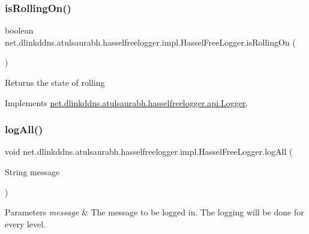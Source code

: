\subsubsection{\texorpdfstring{is\+Rolling\+On()}{isRollingOn()}}
{\footnotesize\ttfamily boolean net.\+dlinkddns.\+atulsaurabh.\+hasselfreelogger.\+impl.\+Hassel\+Free\+Logger.\+is\+Rolling\+On (\begin{DoxyParamCaption}{ }\end{DoxyParamCaption})}

\begin{DoxyReturn}{Returns}
the state of rolling 
\end{DoxyReturn}


Implements \mbox{\hyperlink{interfacenet_1_1dlinkddns_1_1atulsaurabh_1_1hasselfreelogger_1_1api_1_1_logger_a3815e1c6e6688af733cd8d098891c6da}{net.\+dlinkddns.\+atulsaurabh.\+hasselfreelogger.\+api.\+Logger}}.

\mbox{\label{classnet_1_1dlinkddns_1_1atulsaurabh_1_1hasselfreelogger_1_1impl_1_1_hassel_free_logger_af433939b275c708e5334f56a6444e2af}} 
\subsubsection{\texorpdfstring{log\+All()}{logAll()}\hspace{0.1cm}{\footnotesize\ttfamily [1/3]}}
{\footnotesize\ttfamily void net.\+dlinkddns.\+atulsaurabh.\+hasselfreelogger.\+impl.\+Hassel\+Free\+Logger.\+log\+All (\begin{DoxyParamCaption}\item[{String}]{message }\end{DoxyParamCaption})}


\begin{DoxyParams}{Parameters}
{\em message} & The message to be logged in. The logging will be done for every level. \\
\hline
\end{DoxyParams}


